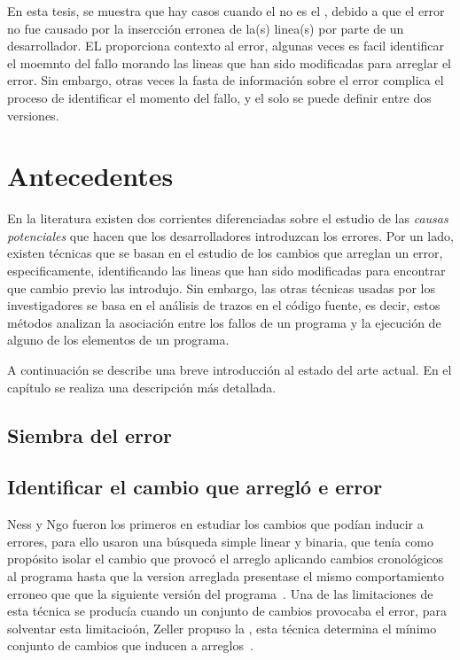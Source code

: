 \documentclass[a4paper, 12pt]{book}
\begin{document}
En esta tesis, se muestra que hay casos cuando el \FFC no es el \BIC, debido a que el error no fue causado por la insercci\'on erronea de la(s) linea(s) por parte de un desarrollador. EL \FFC proporciona contexto al error, algunas veces es facil identificar el moemnto del fallo morando las lineas que han sido modificadas para arreglar el error. Sin embargo, otras veces la fasta de informaci\'on sobre el error complica el proceso de identificar el momento del fallo, y el \FFC solo se puede definir entre dos versiones.

\section{Antecedentes}

En la literatura existen dos corrientes diferenciadas sobre el estudio de las \emph{causas potenciales} que hacen que los desarrolladores introduzcan los errores. Por un lado, existen t\'ecnicas que se basan en el estudio de los cambios que arreglan un error, especificamente, identificando las lineas que han sido modificadas para encontrar que cambio previo las introdujo. Sin embargo, las otras t\'ecnicas usadas por los investigadores se basa en el an\'alisis de trazos en el c\'odigo fuente, es decir, estos m\'etodos analizan la asociaci\'on entre los fallos de un programa y la ejecuci\'on de alguno de los elementos de un programa.

A continuaci\'on se describe una breve introducci\'on al estado del arte actual. En el cap\'itulo  se realiza una descripci\'on m\'as detallada.
\subsection{Siembra del error}
\label{subsec:siembra}

\subsection{Identificar el cambio que arregl\'o e error}
Ness y Ngo fueron los primeros en estudiar los cambios que pod\'ian inducir a errores, para ello usaron una b\'usqueda simple linear y binaria, que ten\'ia como prop\'osito isolar el cambio que provoc\'o el arreglo aplicando cambios cronol\'ogicos al programa hasta que la version arreglada presentase el mismo comportamiento erroneo que que la siguiente versi\'on del programa~\cite{ness1997regression}. Una de las limitaciones de esta t\'ecnica se produc\'ia cuando un conjunto de cambios provocaba el error, para solventar esta limitacio\'on, Zeller propuso la , esta t\'ecnica determina el m\'inimo conjunto de cambios que inducen a arreglos~\cite{zeller1999yesterday}.
\end{document}
